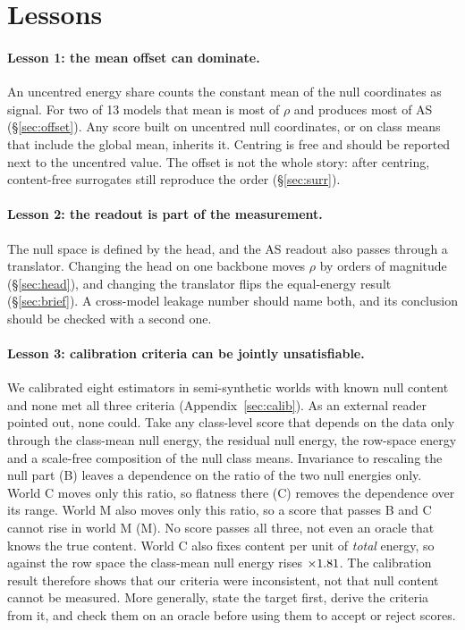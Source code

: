 \documentclass[10pt]{article}
\begin{document}
\section{Lessons}
\label{sec:lessons}
\paragraph{Lesson 1: the mean offset can dominate.}
An uncentred energy share counts the constant mean of the null coordinates as signal. For two of 13 models that mean is most of $\rho$ and produces most of AS (\S\ref{sec:offset}). Any score built on uncentred null coordinates, or on class means that include the global mean, inherits it. Centring is free and should be reported next to the uncentred value. The offset is not the whole story: after centring, content-free surrogates still reproduce the order (\S\ref{sec:surr}).

\paragraph{Lesson 2: the readout is part of the measurement.}
The null space is defined by the head, and the AS readout also passes through a translator. Changing the head on one backbone moves $\rho$ by orders of magnitude (\S\ref{sec:head}), and changing the translator flips the equal-energy result (\S\ref{sec:brief}). A cross-model leakage number should name both, and its conclusion should be checked with a second one.

\paragraph{Lesson 3: calibration criteria can be jointly unsatisfiable.}
We calibrated eight estimators in semi-synthetic worlds with known null content and none met all three criteria (Appendix~\ref{sec:calib}). As an external reader pointed out, none could. Take any class-level score that depends on the data only through the class-mean null energy, the residual null energy, the row-space energy and a scale-free composition of the null class means. Invariance to rescaling the null part (B) leaves a dependence on the ratio of the two null energies only. World C moves only this ratio, so flatness there (C) removes the dependence over its range. World M also moves only this ratio, so a score that passes B and C cannot rise in world M (M). No score passes all three, not even an oracle that knows the true content. World C also fixes content per unit of \emph{total} energy, so against the row space the class-mean null energy rises ${\times}1.81$. The calibration result therefore shows that our criteria were inconsistent, not that null content cannot be measured. More generally, state the target first, derive the criteria from it, and check them on an oracle before using them to accept or reject scores.
\end{document}
